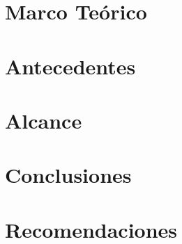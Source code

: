 \documentclass[10pt, letterpaper]{report}
\newcommand{\defaultparformat}[1]{
	{\setlength{\parskip}{2ex}
    }
}
\begin{document}
\ifdefined\CAPmarcoteorico
	\newpage
	\chapter{Marco Teórico}
	\ifdefined\parpordefecto
		\defaultparformat{marco_teorico}
	\else
		
	\fi
\fi

\ifdefined\CAPantecedentes
	\newpage
	\chapter{Antecedentes}
	\ifdefined\parpordefecto
    	\defaultparformat{antecedentes}
    \else
    	
    \fi  
\fi

\ifdefined\CAPalcance
	\newpage
	\chapter{Alcance}
	\ifdefined\parpordefecto
    	\defaultparformat{alcance}
    \else
    	
    \fi 
\fi

\newpage
\ifdefined\parpordefecto
	\defaultparformat{capitulos}
\else
	
\fi

\newpage
\ifdefined\parpordefecto
	\defaultparformat{resultados}
\else
	
\fi

\ifdefined\CAPconclusiones
	\newpage
	\chapter{Conclusiones}
	\ifdefined\parpordefecto
		\defaultparformat{conclusiones}
	\else
		
	\fi
\fi

\ifdefined\CAPrecomendaciones
	\newpage
	\chapter{Recomendaciones}
	\ifdefined\parpordefecto
		\defaultparformat{recomendaciones}
	\else
		
	\fi
\fi
\end{document}

